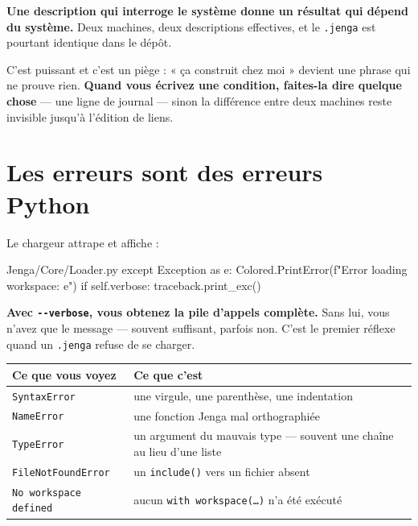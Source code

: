 \begin{nkpiege}
\textbf{Une description qui interroge le système donne un résultat qui dépend du
système.} Deux machines, deux descriptions effectives, et le
\texttt{.jenga} est pourtant identique dans le dépôt.

C'est puissant et c'est un piège : « ça construit chez moi » devient une phrase
qui ne prouve rien. \textbf{Quand vous écrivez une condition, faites-la dire
quelque chose} --- une ligne de journal --- sinon la différence entre deux
machines reste invisible jusqu'à l'édition de liens.
\end{nkpiege}

\section{Les erreurs sont des erreurs Python}

\begin{nkretenir}
Le chargeur attrape et affiche :

\begin{nkcode}{Jenga/Core/Loader.py}
except Exception as e:
    Colored.PrintError(f"Error loading workspace: {e}")
    if self.verbose:
        traceback.print_exc()
\end{nkcode}

\textbf{Avec \texttt{-{}-verbose}, vous obtenez la pile d'appels complète.} Sans
lui, vous n'avez que le message --- souvent suffisant, parfois non. C'est le
premier réflexe quand un \texttt{.jenga} refuse de se charger.
\end{nkretenir}

\begin{center}
\begin{tabular}{@{}ll@{}}
\toprule
\textbf{Ce que vous voyez} & \textbf{Ce que c'est} \\
\midrule
\texttt{SyntaxError} & une virgule, une parenthèse, une indentation \\
\texttt{NameError} & une fonction Jenga mal orthographiée \\
\texttt{TypeError} & un argument du mauvais type --- souvent une chaîne au lieu d'une liste \\
\texttt{FileNotFoundError} & un \texttt{include()} vers un fichier absent \\
\texttt{No workspace defined} & aucun \texttt{with workspace(\dots)} n'a été exécuté \\
\bottomrule
\end{tabular}
\end{center}

